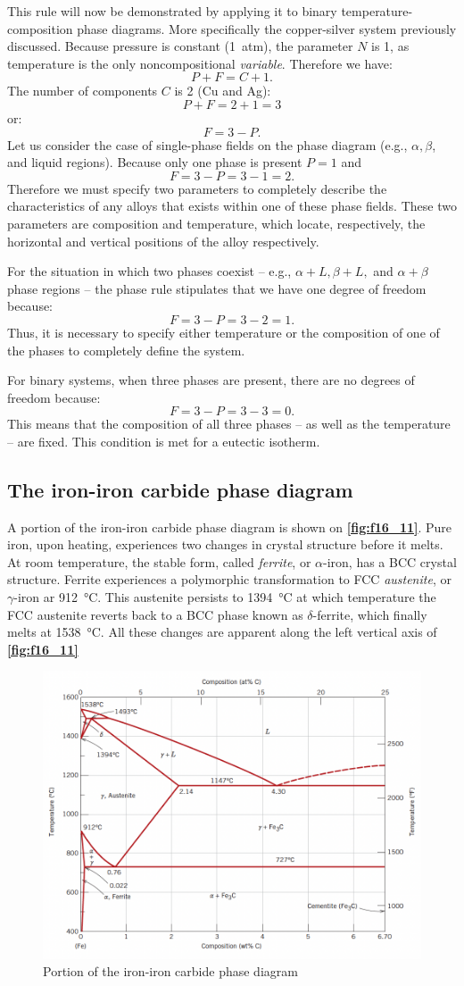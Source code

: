 This rule will now be demonstrated by applying it to binary temperature-composition phase diagrams. More specifically the copper-silver system previously discussed. Because pressure is constant (\qty{1}{atm}), the parameter $N$ is 1, as temperature is the only noncompositional \textit{variable}. Therefore we have:
\[ 
P + F = C + 1
.\]
The number of components $C$ is 2 (Cu and Ag):
\[ 
P + F = 2+1 = 3
\]
or:
\[ 
F = 3-P
.\]
Let us consider the case of single-phase fields on the phase diagram (e.g., $\alpha, \beta$, and liquid regions). Because only one phase is present $P = 1$ and
\[ 
F = 3-P = 3-1 = 2
.\]
Therefore we must specify two parameters to completely describe the characteristics of any alloys that exists within one of these phase fields. These two parameters are composition and temperature, which locate, respectively, the horizontal and vertical positions of the alloy respectively. 

For the situation in which two phases coexist -- e.g., $\alpha + L, \beta + L,$ and $\alpha + \beta$ phase regions -- the phase rule stipulates that we have one degree of freedom because:
\[ 
F = 3 - P = 3- 2 = 1
.\]
Thus, it is necessary to specify either temperature or the composition of one of the phases to completely define the system. 

For binary systems, when three phases are present, there are no degrees of freedom because:
\[ 
F = 3 - P = 3 - 3 = 0
.\]
This means that the composition of all three phases -- as well as the temperature -- are fixed. This condition is met for a eutectic isotherm.


\subsection{The iron-iron carbide phase diagram}
A portion of the iron-iron carbide phase diagram is shown on \textbf{\autoref{fig:f16_11}}. Pure iron, upon heating, experiences two changes in crystal structure before it melts. At room temperature, the stable form, called \textit{ferrite}, or $\alpha$-iron, has a BCC crystal structure. Ferrite experiences a polymorphic transformation to FCC \textit{austenite}, or $\gamma$-iron ar \qty{912}{\celsius}. This austenite persists to \qty{1394}{\celsius} at which temperature the FCC austenite reverts back to a BCC phase known as $\delta$-ferrite, which finally melts at \qty{1538}{\celsius}. All these changes are apparent along the left vertical axis of \textbf{\autoref{fig:f16_11}}

\begin{figure} [ht]
  \centering
  \includegraphics[width=0.5\linewidth]{./figures/f16_11.png}
  \caption{Portion of the iron-iron carbide phase diagram}
  \label{fig:f16_11}
\end{figure}

